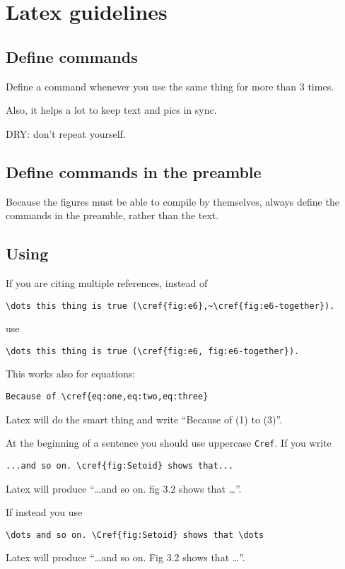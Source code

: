 \section{Latex guidelines}

\subsection*{Define commands }

Define a command whenever you use the same thing for more than 3 times.

Also, it helps a lot to keep text and pics in sync.

DRY: don't repeat yourself.

\subsection{Define commands in the preamble }

Because the figures must be able to compile by themselves, always define the commands in the preamble, rather than the text.

\subsection{Using }

If you are citing multiple references, instead of
%
\begin{verbatim}
\dots this thing is true (\cref{fig:e6},~\cref{fig:e6-together}).
\end{verbatim}
%
use
%
\begin{verbatim}
\dots this thing is true (\cref{fig:e6, fig:e6-together}).
\end{verbatim}
%
This works also for equations:
%
\begin{verbatim}
Because of \cref{eq:one,eq:two,eq:three}
\end{verbatim}
%
Latex will do the smart thing and write ``Because of (1) to (3)''.

At the beginning of a sentence you should use uppercase \texttt{Cref}.
If you write
%
\begin{verbatim}
...and so on. \cref{fig:Setoid} shows that...
\end{verbatim}
%
Latex will produce ``\dots and so on.
fig 3.2 shows that \dots''.

If instead you use
\begin{verbatim}
\dots and so on. \Cref{fig:Setoid} shows that \dots
\end{verbatim}
Latex will produce ``\dots and so on.
Fig 3.2 shows that \dots''.


